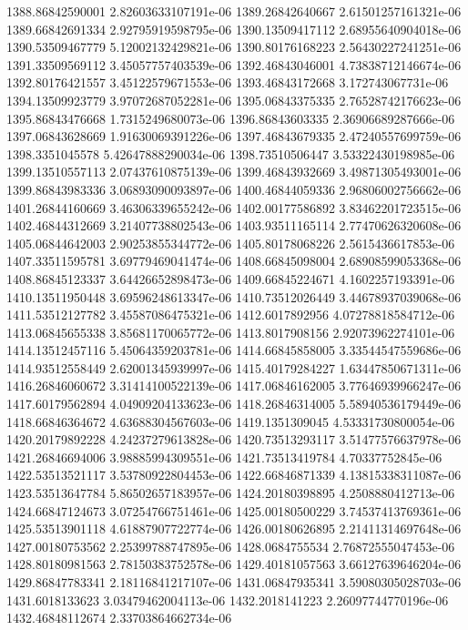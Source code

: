 {1388.86842590001 2.82603633107191e-06
1389.26842640667 2.61501257161321e-06
1389.66842691334 2.92795919598795e-06
1390.13509417112 2.68955640904018e-06
1390.53509467779 5.12002132429821e-06
1390.80176168223 2.56430227241251e-06
1391.33509569112 3.45057757403539e-06
1392.46843046001 4.73838712146674e-06
1392.80176421557 3.45122579671553e-06
1393.46843172668 3.172743067731e-06
1394.13509923779 3.97072687052281e-06
1395.06843375335 2.76528742176623e-06
1395.86843476668 1.7315249680073e-06
1396.86843603335 2.36906689287666e-06
1397.06843628669 1.91630069391226e-06
1397.46843679335 2.47240557699759e-06
1398.3351045578 5.42647888290034e-06
1398.73510506447 3.53322430198985e-06
1399.13510557113 2.07437610875139e-06
1399.46843932669 3.49871305493001e-06
1399.86843983336 3.06893090093897e-06
1400.46844059336 2.96806002756662e-06
1401.26844160669 3.46306339655242e-06
1402.00177586892 3.83462201723515e-06
1402.46844312669 3.21407738802543e-06
1403.93511165114 2.77470626320608e-06
1405.06844642003 2.90253855344772e-06
1405.80178068226 2.5615436617853e-06
1407.33511595781 3.69779469041474e-06
1408.66845098004 2.68908599053368e-06
1408.86845123337 3.64426652898473e-06
1409.66845224671 4.1602257193391e-06
1410.13511950448 3.69596248613347e-06
1410.73512026449 3.44678937039068e-06
1411.53512127782 3.45587086475321e-06
1412.6017892956 4.07278818584712e-06
1413.06845655338 3.85681170065772e-06
1413.8017908156 2.92073962274101e-06
1414.13512457116 5.45064359203781e-06
1414.66845858005 3.33544547559686e-06
1414.93512558449 2.62001345939997e-06
1415.40179284227 1.63447850671311e-06
1416.26846060672 3.31414100522139e-06
1417.06846162005 3.77646939966247e-06
1417.60179562894 4.04909204133623e-06
1418.26846314005 5.58940536179449e-06
1418.66846364672 4.63688304567603e-06
1419.1351309045 4.53331730800054e-06
1420.20179892228 4.24237279613828e-06
1420.73513293117 3.51477576637978e-06
1421.26846694006 3.98885994309551e-06
1421.73513419784 4.70337752845e-06
1422.53513521117 3.53780922804453e-06
1422.66846871339 4.13815338311087e-06
1423.53513647784 5.86502657183957e-06
1424.20180398895 4.2508880412713e-06
1424.66847124673 3.07254766751461e-06
1425.00180500229 3.74537413769361e-06
1425.53513901118 4.61887907722774e-06
1426.00180626895 2.21411314697648e-06
1427.00180753562 2.25399788747895e-06
1428.0684755534 2.76872555047453e-06
1428.80180981563 2.78150383752578e-06
1429.40181057563 3.66127639646204e-06
1429.86847783341 2.18116841217107e-06
1431.06847935341 3.59080305028703e-06
1431.6018133623 3.03479462004113e-06
1432.2018141223 2.26097744770196e-06
1432.46848112674 2.33703864662734e-06
}

